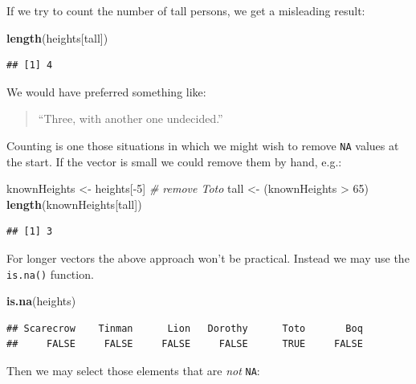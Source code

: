 \documentclass[]{book}
\makeatletter
\newenvironment{Shaded}{\begin{snugshade}}{\end{snugshade}}
\newcommand{\KeywordTok}[1]{\textcolor[rgb]{0.13,0.29,0.53}{\textbf{{#1}}}}
\newcommand{\DecValTok}[1]{\textcolor[rgb]{0.00,0.00,0.81}{{#1}}}
\newcommand{\StringTok}[1]{\textcolor[rgb]{0.31,0.60,0.02}{{#1}}}
\newcommand{\CommentTok}[1]{\textcolor[rgb]{0.56,0.35,0.01}{\textit{{#1}}}}
\newcommand{\NormalTok}[1]{{#1}}
\newenvironment{kframe}{%
\medskip{}
\setlength{\fboxsep}{.8em}
 \def\at@end@of@kframe{}%
 \ifinner\ifhmode%
  \def\at@end@of@kframe{\end{minipage}}%
  \begin{minipage}{\columnwidth}%
 \fi\fi%
 \def\FrameCommand##1{\hskip\@totalleftmargin \hskip-\fboxsep
 \colorbox{shadecolor}{##1}\hskip-\fboxsep
     \hskip-\linewidth \hskip-\@totalleftmargin \hskip\columnwidth}%
 \MakeFramed {\advance\hsize-\width
   \@totalleftmargin\z@ \linewidth\hsize
   \@setminipage}}%
 {\par\unskip\endMakeFramed%
 \at@end@of@kframe}
\renewenvironment{Shaded}{\begin{kframe}}{\end{kframe}}
\theoremstyle{definition}
\theoremstyle{definition}
\theoremstyle{remark}
\makeatother
\begin{document}
If we try to count the number of tall persons, we get a misleading
result:

\begin{Shaded}
\begin{Highlighting}[]
\KeywordTok{length}\NormalTok{(heights[tall])}
\end{Highlighting}
\end{Shaded}

\begin{verbatim}
## [1] 4
\end{verbatim}

We would have preferred something like:

\begin{quote}
``Three, with another one undecided.''
\end{quote}

Counting is one those situations in which we might wish to remove
\texttt{NA} values at the start. If the vector is small we could remove
them by hand, e.g.:

\begin{Shaded}
\begin{Highlighting}[]
\NormalTok{knownHeights <-}\StringTok{ }\NormalTok{heights[-}\DecValTok{5}\NormalTok{]  }\CommentTok{# remove Toto}
\NormalTok{tall <-}\StringTok{ }\NormalTok{(knownHeights >}\StringTok{ }\DecValTok{65}\NormalTok{)}
\KeywordTok{length}\NormalTok{(knownHeights[tall])}
\end{Highlighting}
\end{Shaded}

\begin{verbatim}
## [1] 3
\end{verbatim}

For longer vectors the above approach won't be practical. Instead we may
use the \texttt{is.na()} function.

\begin{Shaded}
\begin{Highlighting}[]
\KeywordTok{is.na}\NormalTok{(heights)}
\end{Highlighting}
\end{Shaded}

\begin{verbatim}
## Scarecrow    Tinman      Lion   Dorothy      Toto       Boq 
##     FALSE     FALSE     FALSE     FALSE      TRUE     FALSE
\end{verbatim}

Then we may select those elements that are \emph{not} \texttt{NA}:
\end{document}
